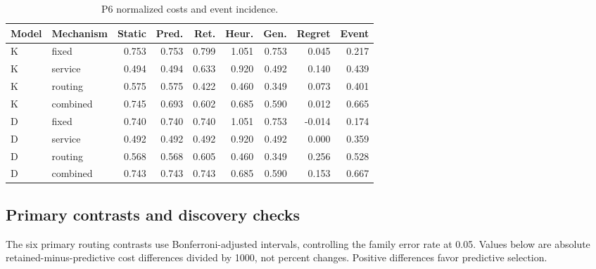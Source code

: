 \begin{table}[htbp]\caption{P6 normalized costs and event incidence.}\centering\small\setlength{\tabcolsep}{3pt}

\begin{tabular}{llrrrrrrr}\toprule

Model & Mechanism & Static & Pred. & Ret. & Heur. & Gen. & Regret & Event\\\midrule

K & fixed & 0.753 & 0.753 & 0.799 & 1.051 & 0.753 & 0.045 & 0.217\\

K & service & 0.494 & 0.494 & 0.633 & 0.920 & 0.492 & 0.140 & 0.439\\

K & routing & 0.575 & 0.575 & 0.422 & 0.460 & 0.349 & 0.073 & 0.401\\

K & combined & 0.745 & 0.693 & 0.602 & 0.685 & 0.590 & 0.012 & 0.665\\

D & fixed & 0.740 & 0.740 & 0.740 & 1.051 & 0.753 & -0.014 & 0.174\\

D & service & 0.492 & 0.492 & 0.492 & 0.920 & 0.492 & 0.000 & 0.359\\

D & routing & 0.568 & 0.568 & 0.605 & 0.460 & 0.349 & 0.256 & 0.528\\

D & combined & 0.743 & 0.743 & 0.743 & 0.685 & 0.590 & 0.153 & 0.667\\

\bottomrule\end{tabular}\end{table}

\clearpage

\subsection{Primary contrasts and discovery checks}

The six primary routing contrasts use Bonferroni-adjusted intervals, controlling the family error rate at 0.05. Values below are absolute retained-minus-predictive cost differences divided by 1000, not percent changes. Positive differences favor predictive selection.

